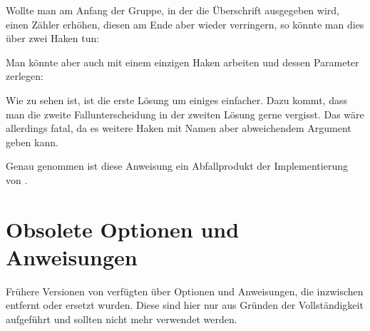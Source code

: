 \begin{Example}
  Wollte man am Anfang der Gruppe, in der die Überschrift ausgegeben wird,
  einen Zähler erhöhen, diesen am Ende aber wieder verringern, so könnte man
  dies über zwei Haken tun:
\begin{lstcode}
              {\stepZaehler}
  \newcommand*{\restepZaehler}[1]{%
    \addtocounter{#1Zaehler}{-1}%
  }
              {\restepcounter}
\end{lstcode}
  Man könnte aber auch mit einem einzigen Haken arbeiten und dessen Parameter
  zerlegen:
\begin{lstcode}
  \newcommand*{\changeZaehler}[1]{%
    \SplitDoHook{#1}{\Gruppe}{\Ebene}%
    \Ifstr{\Gruppe}{begingroup}{%
      \stepcounter{\Ebene Zaehler}%
    }{%
      \Ifstr{\Gruppe}{endgroup}{%
        \addtocounter{\Ebene Zaehler}{-1}%
      }{}%
    }%
  }
              {\changeZaehler}
\end{lstcode}
  Wie zu sehen ist, ist die erste Lösung um einiges einfacher. Dazu kommt,
  dass man die zweite Fallunterscheidung in der zweiten Lösung gerne
  vergisst. Das wäre allerdings fatal, da es weitere Haken mit Namen
   aber abweichendem Argument geben kann.
\end{Example}

Genau genommen ist diese Anweisung ein Abfallprodukt der Implementierung
von .%
\EndIndexGroup
%
\EndIndexGroup

\section{Obsolete Optionen und Anweisungen}

Frühere Versionen von  verfügten über Optionen und
Anweisungen, die inzwischen entfernt oder ersetzt wurden. Diese sind hier nur
aus Gründen der Vollständigkeit aufgeführt und sollten nicht mehr verwendet
werden.

%
\EndIndexGroup

\endinput


